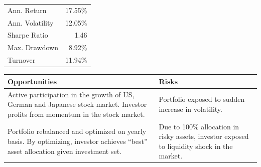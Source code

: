 \documentclass[11pt, parskip=full, DIV=14, headings=small, footsepline, footinclude=false, headsepline]{scrreprt}
\begin{document}
\vspace{\abovedisplayskip}
\begin{minipage}{0.65\textwidth}
\end{minipage}
\begin{minipage}{0.35\textwidth}
\begin{tabular}{lr}
\toprule
Ann. Return & 17.55\%\\
Ann. Volatility & 12.05\%\\
Sharpe Ratio & 1.46 \\
Max. Drawdown & 8.92\% \\
Turnover & 11.94\%\\
\bottomrule
\end{tabular}
\end{minipage}



\begin{table}[H]
\begin{tabularx}{\textwidth}{XX}
  \toprule
  \textbf{\textsf{Opportunities}} & \textbf{\textsf{Risks}} \\
  \midrule
Active participation in the growth of US, German and Japanese stock market. Investor profits from momentum in the stock market. &
Portfolio exposed to sudden increase in volatility. \\[1em]
Portfolio rebalanced and optimized on yearly basis. By optimizing, investor achieves “best” asset allocation given investment set. &
Due to 100\% allocation in risky assets, investor exposed to liquidity shock in the market.\\
  \bottomrule
\end{tabularx}
\end{table}
\end{document}
